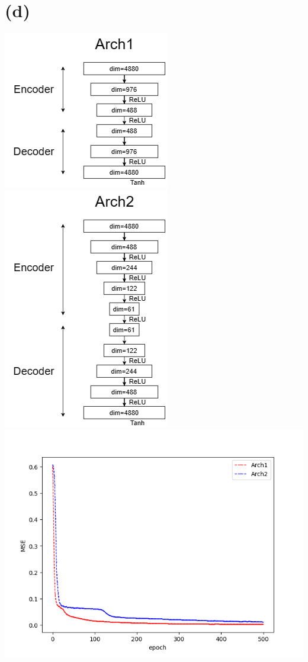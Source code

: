 \documentclass[12pt,a4paper]{article}
\begin{document}
\section*{(d)}
\includegraphics{4-1.png}\\
\includegraphics{4-2.png}
\newpage
\includegraphics{Figure4.png}
\end{document}
